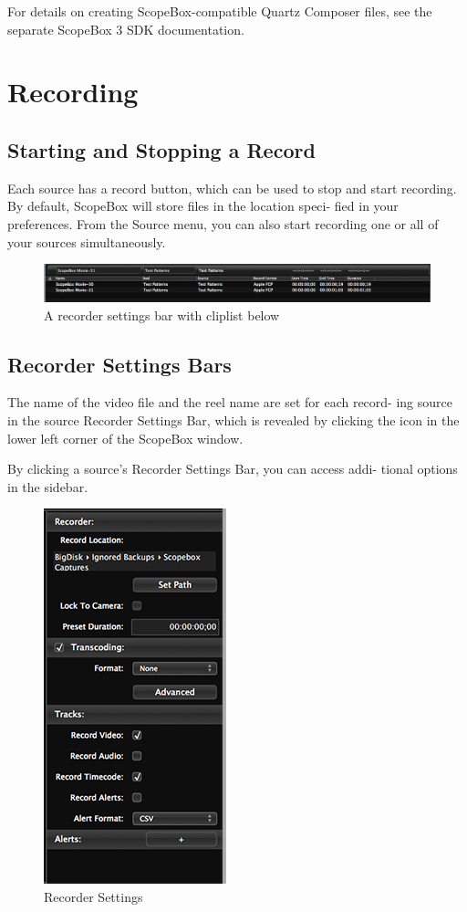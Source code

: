 \documentclass[10,letterpaper,]{report}
\begin{document}
For details on creating ScopeBox-compatible Quartz Composer files, see
the separate ScopeBox 3 SDK documentation.

\chapter{Recording}

\section{Starting and Stopping a Record}

Each source has a record button, which can be used to stop and start
recording. By default, ScopeBox will store files in the location speci-
fied in your preferences. From the Source menu, you can also start
recording one or all of your sources simultaneously.

\begin{figure}[htbp]
\centering
\includegraphics{images/RecordBar.png}
\caption{A recorder settings bar with cliplist below}
\end{figure}

\section{Recorder Settings Bars}

The name of the video file and the reel name are set for each record-
ing source in the source Recorder Settings Bar, which is revealed by
clicking the icon in the lower left corner of the ScopeBox window.

By clicking a source's Recorder Settings Bar, you can access addi-
tional options in the sidebar.

\begin{figure}[htbp]
\centering
\includegraphics{images/RecorderSidebar.png}
\caption{Recorder Settings}
\end{figure}
\end{document}
